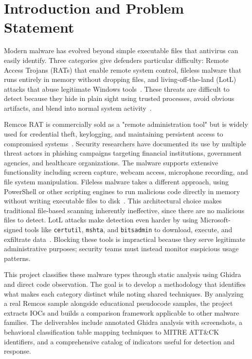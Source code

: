\documentclass[sigconf]{acmart}
\begin{document}

\section{Introduction and Problem Statement}

\vspace{0.5em}
\qquad Modern malware has evolved beyond simple executable files that antivirus can easily identify. Three categories give defenders particular difficulty: Remote Access Trojans (RATs) that enable remote system control, fileless malware that runs entirely in memory without dropping files, and living-off-the-land (LotL) attacks that abuse legitimate Windows tools~\cite{lolbas2024project, mitre2024attack}. These threats are difficult to detect because they hide in plain sight using trusted processes, avoid obvious artifacts, and blend into normal system activity~\cite{crowdstrike2024fileless}.

\qquad Remcos RAT is commercially sold as a "remote administration tool" but is widely used for credential theft, keylogging, and maintaining persistent access to compromised systems~\cite{elastic2024remcos}. Security researchers have documented its use by multiple threat actors in phishing campaigns targeting financial institutions, government agencies, and healthcare organizations. The malware supports extensive functionality including screen capture, webcam access, microphone recording, and file system manipulation. Fileless malware takes a different approach, using PowerShell or other scripting engines to run malicious code directly in memory without writing executable files to disk~\cite{crowdstrike2024fileless}. This architectural choice makes traditional file-based scanning inherently ineffective, since there are no malicious files to detect. LotL attacks make detection even harder by using Microsoft-signed tools like \texttt{certutil}, \texttt{mshta}, and \texttt{bitsadmin} to download, execute, and exfiltrate data~\cite{lolbas2024project}. Blocking these tools is impractical because they serve legitimate administrative purposes; security teams must instead monitor suspicious usage patterns.

\qquad This project classifies these malware types through static analysis using Ghidra~\cite{nsacyber2024ghidra} and direct code observation. The goal is to develop a methodology that identifies what makes each category distinct while noting shared techniques. By analyzing a real Remcos sample alongside educational pseudocode samples, the project extracts IOCs and builds a comparison framework applicable to other malware families. The deliverables include annotated Ghidra analysis with screenshots, a behavioral classification table mapping techniques to MITRE ATT\&CK identifiers, and a comprehensive catalog of indicators useful for detection and response.
\end{document}
